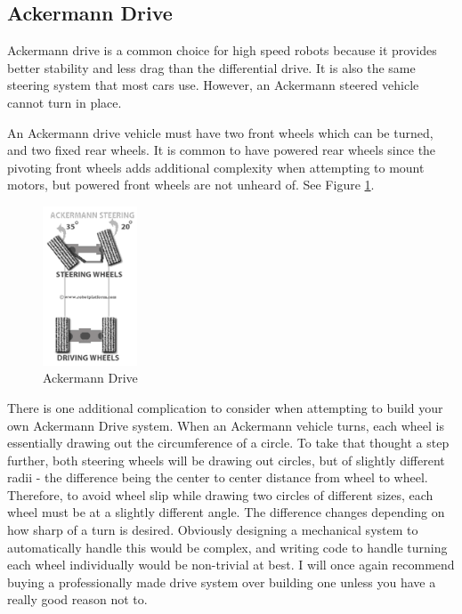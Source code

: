 

\subsection{Ackermann Drive}

Ackermann drive is a common choice for high speed robots because it provides better stability and less drag than the differential drive. It is also the same steering system that most cars use. However, an Ackermann steered vehicle cannot turn in place.

An Ackermann drive vehicle must have two front wheels which can be turned, and two fixed rear wheels. It is common to have powered rear wheels since the pivoting front wheels adds additional complexity when attempting to mount motors, but powered front wheels are not unheard of. See Figure \ref{fig:ackermann}.

\begin{figure}[h]
\centering
\includegraphics[width=0.25\textwidth]{Ackermann_Drive2.png}
\caption{Ackermann Drive}
\label{fig:ackermann}
\end{figure}

There is one additional complication to consider when attempting to build your own Ackermann Drive system. When an Ackermann vehicle turns, each wheel is essentially drawing out the circumference of a circle. To take that thought a step further, both steering wheels will be drawing out circles, but of slightly different radii - the difference being the center to center distance from wheel to wheel. Therefore, to avoid wheel slip while drawing two circles of different sizes, each wheel must be at a slightly different angle. The difference changes depending on how sharp of a turn is desired. Obviously designing a mechanical system to automatically handle this would be complex, and writing code to handle turning each wheel individually would be non-trivial at best. I will once again recommend buying a professionally made drive system over building one unless you have a really good reason not to.

